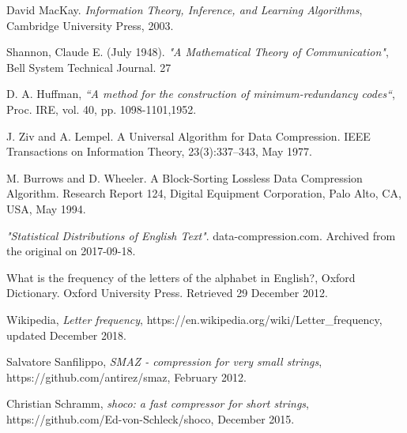 \documentclass[]{article}
\begin{document}
\begin{thebibliography}{1}

	 David MacKay. {\em Information Theory, Inference, and Learning Algorithms}, Cambridge University Press, 2003.

	 Shannon, Claude E. (July 1948). {\em"A Mathematical Theory of Communication"}, Bell System Technical Journal. 27
 
	 D. A. Huffman, {\em“A method for the construction of minimum-redundancy codes“}, Proc. IRE, vol. 40, pp. 1098-1101,1952.
 
 	 J. Ziv and A. Lempel. A Universal Algorithm for Data Compression. IEEE Transactions on Information Theory, 23(3):337–343, May 1977.
 
	 M. Burrows and D. Wheeler. A Block-Sorting Lossless Data Compression Algorithm. Research Report 124, Digital Equipment Corporation, Palo Alto, CA, USA, May 1994.

	 {\em "Statistical Distributions of English Text"}. data-compression.com. Archived from the original on 2017-09-18.

 	 What is the frequency of the letters of the alphabet in English?, Oxford Dictionary. Oxford University Press. Retrieved 29 December 2012.

	 Wikipedia, {\em Letter frequency}, https://en.wikipedia.org/wiki/Letter\_frequency, updated December 2018.

 	 Salvatore Sanfilippo, {\em SMAZ - compression for very small strings}, https://github.com/antirez/smaz, February 2012.

 	 Christian Schramm, {\em shoco: a fast compressor for short strings}, https://github.com/Ed-von-Schleck/shoco, December 2015.

\end{thebibliography}
\end{document}

